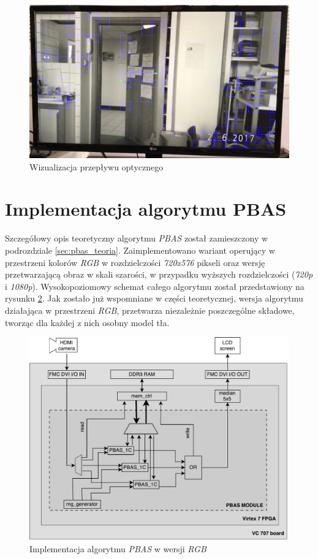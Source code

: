 	\begin{figure}[h!]
		\centering
		\includegraphics[scale=0.2]{img/4/vibe_plus_example.png}
		\caption{Wizualizacja przepływu optycznego}
		\label{fig:vibe_plus_demo}
	\end{figure}
	

\section{Implementacja algorytmu PBAS}
\label{sec:fpga_pbas}

Szczegółowy opis teoretyczny algorytmu \textit{PBAS} został zamieszczony w podrozdziale \ref{sec:pbas_teoria}. Zaimplementowano wariant operujący w przestrzeni kolorów \textit{RGB} w rozdzielczości \textit{720x576} pikseli oraz wersję przetwarzającą obraz w skali szarości, w przypadku wyższych rozdzielczości (\textit{720p} i \textit{1080p}). Wysokopoziomowy schemat całego algorytmu został przedstawiony na rysunku \ref{fig:pbas_diagram}. Jak zostało już wspomniane w części teoretycznej, wersja algorytmu działająca w przestrzeni \textit{RGB}, przetwarza niezależnie poszczególne składowe, tworząc dla każdej z nich osobny model tła. 
	
	\begin{figure}[h!]
		\centering
		\includegraphics[scale=0.6]{img/4/pbas.pdf}
		\caption{Implementacja algorytmu \textit{PBAS} w wersji \textit{RGB}}
		\label{fig:pbas_diagram}
	\end{figure}

